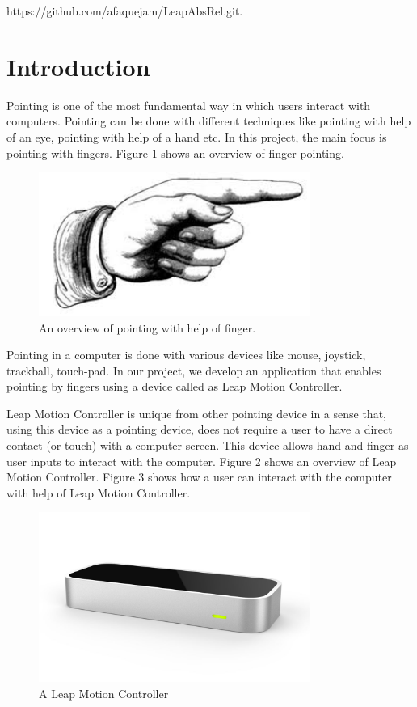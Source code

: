 \documentclass[titlepage]{article}
\begin{document}
https://github.com/afaquejam/LeapAbsRel.git. 

\section{Introduction}
Pointing is one of the most fundamental way in which users interact with computers. Pointing can be done with different techniques like pointing with help of an eye, pointing with help of a hand etc. In this project, the main focus is pointing with fingers. Figure 1 shows an overview of finger pointing.

\begin{figure}[!h]
\centering
\includegraphics[width=3.5in]{Figure_1}
\caption{An overview of pointing with help of finger.}
\end{figure}

Pointing in a computer is done with various devices like mouse, joystick, trackball, touch-pad. In our project, we develop an application that enables pointing by fingers using a device called as Leap Motion Controller.

Leap Motion Controller is unique from other pointing device in a sense that, using this device as a pointing device, does not require a user to have a direct contact (or touch) with a computer screen. This device allows hand and finger as user inputs to interact with the computer. Figure 2 shows an overview of Leap Motion Controller. Figure 3 shows how a user can interact with the computer with help of Leap Motion Controller.

\begin{figure}[!h]
\centering
\includegraphics[width=3.5in]{Figure_2}
\caption{A Leap Motion Controller}
\end{figure}
\end{document}
